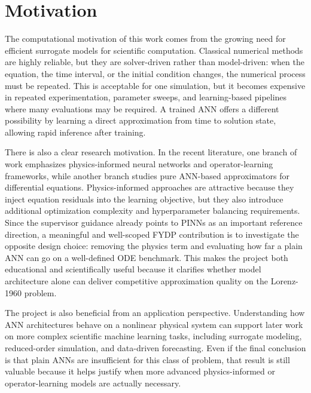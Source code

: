 \section{Motivation}
The computational motivation of this work comes from the growing need for efficient surrogate models for scientific computation. Classical numerical methods are highly reliable, but they are solver-driven rather than model-driven: when the equation, the time interval, or the initial condition changes, the numerical process must be repeated. This is acceptable for one simulation, but it becomes expensive in repeated experimentation, parameter sweeps, and learning-based pipelines where many evaluations may be required. A trained ANN offers a different possibility by learning a direct approximation from time to solution state, allowing rapid inference after training.

There is also a clear research motivation. In the recent literature, one branch of work emphasizes physics-informed neural networks and operator-learning frameworks, while another branch studies pure ANN-based approximators for differential equations. Physics-informed approaches are attractive because they inject equation residuals into the learning objective, but they also introduce additional optimization complexity and hyperparameter balancing requirements. Since the supervisor guidance already points to PINNs as an important reference direction, a meaningful and well-scoped FYDP contribution is to investigate the opposite design choice: removing the physics term and evaluating how far a plain ANN can go on a well-defined ODE benchmark. This makes the project both educational and scientifically useful because it clarifies whether model architecture alone can deliver competitive approximation quality on the Lorenz-1960 problem.

The project is also beneficial from an application perspective. Understanding how ANN architectures behave on a nonlinear physical system can support later work on more complex scientific machine learning tasks, including surrogate modeling, reduced-order simulation, and data-driven forecasting. Even if the final conclusion is that plain ANNs are insufficient for this class of problem, that result is still valuable because it helps justify when more advanced physics-informed or operator-learning models are actually necessary.

